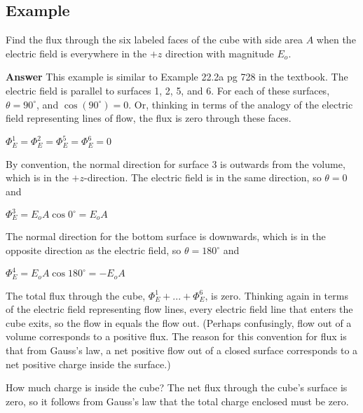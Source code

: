 \documentclass{article}
\begin{document}
\subsection{Example}



Find the flux through the six labeled faces of the cube with side area $A$ when the electric field is everywhere in the $+z$ direction with magnitude $E_o$.

{\bf Answer} This example is similar to Example 22.2a pg 728 in the textbook. The electric field is parallel to surfaces 1, 2, 5, and 6. For each of these surfaces, $\theta=90^\circ$, and $\cos( 90^\circ)=0$. Or, thinking in terms of the analogy of the electric field representing lines of flow, the flux is zero through these faces. 



$\Phi_E^{1}=\Phi_E^{2}=\Phi_E^{5}=\Phi_E^{6}=0$

By convention, the normal direction for surface 3 is outwards from the volume, which is in the $+z$-direction. The electric field is in the same direction, so $\theta=0$ and

$\Phi_E^{3}=E_oA\cos0^\circ=E_oA$

The normal direction for the bottom surface is downwards, which is in the opposite direction as the electric field, so $\theta=180^\circ$ and

$\Phi_E^{4}=E_oA\cos 180^\circ=-E_oA$

The total flux through the cube, $\Phi_E^1+...+\Phi_E^6$, is zero. Thinking again in terms of the electric field representing flow lines, every electric field line that enters the cube exits, so the flow in equals the flow out. (Perhaps confusingly, flow out of a volume corresponds to a positive flux. The reason for this convention for flux is that from Gauss's law, a net positive flow out of a closed surface corresponds to a net positive charge inside the surface.)

How much charge is inside the cube? The net flux through the cube's surface is zero, so it follows from Gauss's law that the total charge enclosed must be zero.

\ifsolutions

\else
\end{document}

